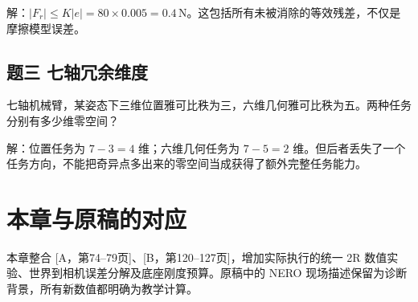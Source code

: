 解：$|F_r|\le K|e|=80\times0.005=0.4\,\mathrm N$。这包括所有未被消除的等效残差，不仅是摩擦模型误差。

\subsection*{题三 七轴冗余维度}
七轴机械臂，某姿态下三维位置雅可比秩为三，六维几何雅可比秩为五。两种任务分别有多少维零空间？

解：位置任务为 $7-3=4$ 维；六维几何任务为 $7-5=2$ 维。但后者丢失了一个任务方向，不能把奇异点多出来的零空间当成获得了额外完整任务能力。

\section*{本章与原稿的对应}
本章整合 [A，第74--79页]、[B，第120--127页]，增加实际执行的统一 2R 数值实验、世界到相机误差分解及底座刚度预算。原稿中的 NERO 现场描述保留为诊断背景，所有新数值都明确为教学计算。
